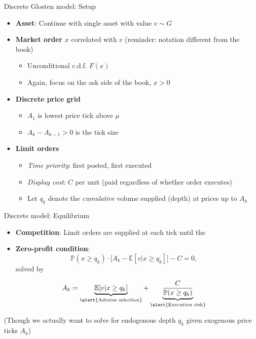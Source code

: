 \documentclass[english,10pt
,aspectratio=169
]{beamer}
\begin{document}
\begin{frame}{Discrete Glosten model: Setup}
	\begin{itemize}
		\item \textbf{Asset}: Continue with single asset with value $v \sim G$
		\item \textbf{Market order $x$} correlated with $v$ (reminder: notation different from the book)
		\begin{itemize}
			\item Unconditional c.d.f. $F(x)$
			\item Again, focus on the ask side of the book, $x>0$
		\end{itemize}
		\item \textbf{Discrete price grid}
		\begin{itemize}
			\item $A_1$ is lowest price tick above $\mu$
			\item $A_k-A_{k-1}>0$ is the tick size
		\end{itemize}
		\item \textbf{Limit orders}
		\begin{itemize}
			\item \textit{Time priority}: first posted, first executed
			\item \textit{Display cost}: $C$ per unit (paid regardless of whether order executes)
			\item Let $q_k$ denote the \emph{cumulative} volume supplied (depth) at prices up to $A_k$
		\end{itemize}
	\end{itemize}
\end{frame}


\begin{frame}{Discrete model: Equilibrium}
	\begin{itemize}
		\item \textbf{Competition}: Limit orders are supplied at each tick until the 
		\item \textbf{Zero-profit condition}:
		\[
		\mathbb{P}(x \geq q_k) \cdot \big[ A_k-\mathbb{E}[v|x \geq q_k] \big] - C = 0,
		\]
		\pause
		solved by
		\begin{block}{}
			\[
			A_k = \underbrace{\mathbb{E}[v| x \geq q_k]}_{\text{\alert{Adverse selection}}} + \underbrace{\frac{C}{\mathbb{P}(x \geq q_k)}}_{\text{\alert{Execution risk}}}
			\]
		\end{block}
	\end{itemize}
	(Though we actually want to solve for endogenous depth $q_k$ given exogenous price ticks $A_k$)
\end{frame}
\end{document}
